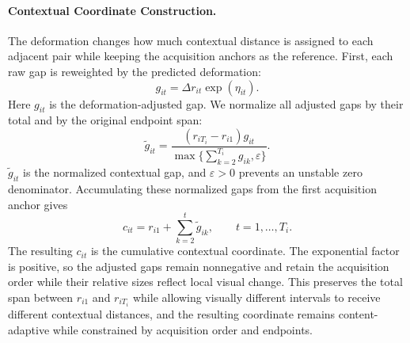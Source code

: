 
\paragraph{Contextual Coordinate Construction.}
The deformation changes how much contextual distance is assigned to each
adjacent pair while keeping the acquisition anchors as the reference.  First,
each raw gap is reweighted by the predicted deformation:
\begin{equation}
g_{it}=\Delta r_{it}\exp(\eta_{it}).
\label{eq:acpe_adjusted_gap}
\end{equation}
Here $g_{it}$ is the deformation-adjusted gap.  We normalize all adjusted
gaps by their total and by the original endpoint span:
\begin{equation}
\widetilde g_{it}
=\frac{(r_{iT_i}-r_{i1})g_{it}}
{\max\{\sum_{k=2}^{T_i}g_{ik},\varepsilon\}}.
\label{eq:acpe_normalized_gap}
\end{equation}
$\widetilde g_{it}$ is the normalized contextual gap, and
$\varepsilon>0$ prevents an unstable zero denominator.  Accumulating these
normalized gaps from the first acquisition anchor gives
\begin{equation}
c_{it}=r_{i1}+\sum_{k=2}^{t}\widetilde g_{ik},
\qquad t=1,\ldots,T_i.
\label{eq:acpe_context_coordinate}
\end{equation}
The resulting $c_{it}$ is the cumulative contextual coordinate.  The
exponential factor is positive, so the adjusted gaps remain nonnegative and
retain the acquisition order while their relative sizes reflect local visual
change.  This preserves the total span between $r_{i1}$ and $r_{iT_i}$ while
allowing visually different intervals to receive different contextual
distances, and the resulting coordinate remains content-adaptive while
constrained by acquisition order and endpoints.

